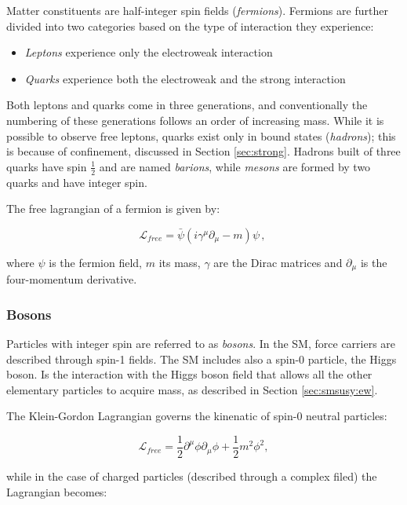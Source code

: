 Matter constituents are half-integer spin fields (\textit{fermions}). Fermions are further divided into two categories based on the type of interaction they experience:
\begin{itemize}
\item \textit{Leptons} experience only the electroweak interaction
\item \textit{Quarks} experience both the electroweak and the strong interaction
\end{itemize}

Both leptons and quarks come in three generations, and conventionally the numbering of these generations follows an order of increasing mass. While it is possible to observe free leptons, quarks exist only in bound states (\textit{hadrons}); this is because of confinement, discussed in Section \ref{sec:strong}. Hadrons built of three quarks have spin $\frac{1}{2}$ and are named \textit{barions}, while \textit{mesons} are formed by two quarks and have integer spin.


The free lagrangian of a fermion is given by:

\begin{equation}
 \mathcal{L}_{free} = \bar{\psi} \left( i \gamma^{\mu} \partial_{\mu} - m \right) \psi \, , \
 \label{eq:sm:dirac}
\end{equation}

\noindent where $\psi$ is the fermion field, $m$ its mass, $\gamma$ are the Dirac matrices and $\partial_{\mu}$ is the four-momentum derivative.


\subsubsection{Bosons}

Particles with integer spin are referred to as \textit{bosons}. In the SM, force carriers are described through spin-1 fields. 
The SM includes also a spin-0 particle, the Higgs boson. Is the interaction with the Higgs boson field that allows all the other elementary particles to acquire mass, as described in Section \ref{sec:smsusy:ew}.

The Klein-Gordon Lagrangian governs the kinenatic of spin-0 neutral particles:

\begin{equation}
\mathcal{L}_{free} = \frac{1}{2} \partial^\mu \phi \partial_\mu \phi + \frac{1}{2} m^2 \phi ^2 ,
\end{equation}

 
\noindent while in the case of charged particles (described through a complex filed) the Lagrangian becomes:

